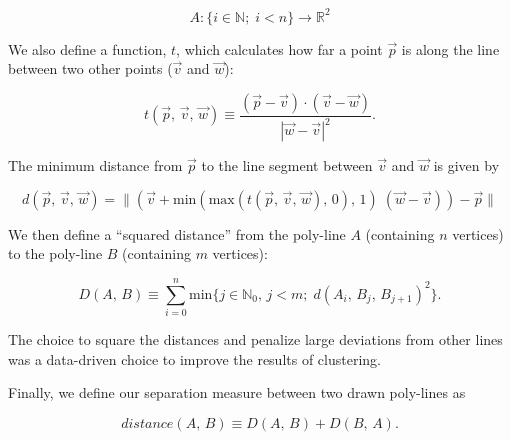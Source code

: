 \documentclass[../main.tex]{subfiles}
\begin{document}
\begin{equation}
A: \{i \in \mathbb{N};\;i<n\} \longrightarrow \mathbb{R}
^2\end{equation}

We also define a function, $t$, which calculates how far a point $\vec{p}$ is along the line between two other points ($\vec{v}$ and $\vec{w}$):

\begin{equation}
t(\vec{p},\,\vec{v},\,\vec{w}) \equiv \frac{(\vec{p} - \vec{v})\cdot(\vec{v} - \vec{w})}{|\vec{w} - \vec{v}|^2}.
\end{equation}

The minimum distance from $\vec{p}$ to the line segment between $\vec{v}$ and $\vec{w}$ is given by

\begin{equation}
d(\vec{p},\,\vec{v},\,\vec{w}) = \|\left(\vec{v} + \mathrm{min}(\mathrm{max}(t(\vec{p},\,\vec{v},\,\vec{w}),\, 0),\, 1)\;(\vec{w} - \vec{v})\right) - \vec{p}\|
\end{equation}

We then define a ``squared distance'' from the poly-line $A$ (containing $n$ vertices) to the poly-line $B$ (containing $m$ vertices):

\begin{equation}
D(A,\,B) \equiv \sum_{i = 0}^{n} \mathrm{min}\{j \in \mathbb{N}_0,\, j < m;\; d(A_i,\, B_j,\, B_{j+1})^2\}.
\end{equation}

The choice to square the distances and penalize large deviations from other lines was a data-driven choice to improve the results of clustering.

Finally, we define our separation measure between two drawn poly-lines as

\begin{equation}
distance(A,\,B) \equiv D(A,\,B) + D(B,\,A).
\end{equation}
\end{document}

